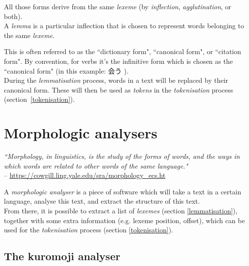 
All those forms derive from the same \emph{lexeme} (by \emph{inflection}, \emph{agglutination}, or both). \\

A \emph{lemma} is a particular inflection that is chosen to represent words belonging to the same \emph{lexeme}. 

This is often referred to as the ``dictionary form", ``canonical form", or ``citation form". By convention, for verbs it's the infinitive form which is chosen as the ``canonical form" (in this example: 会う ).\\

During the \emph{lemmatisation} process, words in a text will be replaced by their canonical form. 
These will then be used as \emph{tokens} in the \emph{tokenisation} process (section~\ref{tokenisation}). \\




\section{Morphologic analysers} \label{morphologic-analysers}


\begin{displayquote}
\emph{``Morphology, in linguistics, is the study of the forms of words, and the ways in which words are related to other words of the same language."}  \\
\phantom{.} \hfill -- \url{https://cowgill.ling.yale.edu/sra/morphology_ecs.ht}
\end{displayquote}
\bigskip

A \emph{morphologic analyser} is a piece of software which will take a text in a certain language, analyse this text, and extract the structure of this text. \\

From there, it is possible to extract a list of \emph{lexemes} (section \ref{lemmatisation}), together with some extra information (e.g. lexeme position, offset), which can be used for the \emph{tokenisation} process (section \ref{tokenisation}). \\


\subsection{The kuromoji analyser}  \label{kuromoji}

